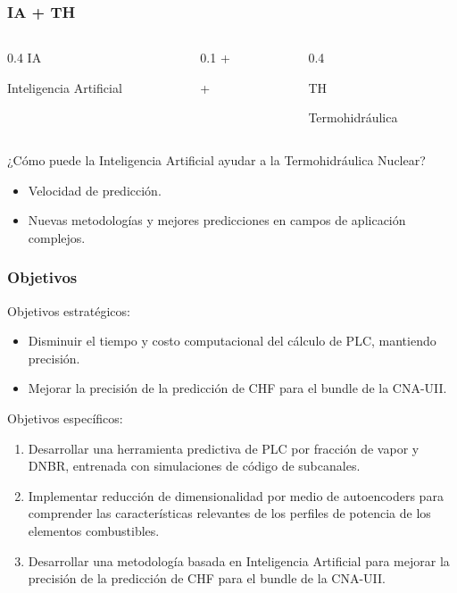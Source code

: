 \documentclass{beamer}
\begin{document}
\begin{frame}
    \frametitle{IA + TH}
    \vspace{2cm}
    \begin{columns}
        \begin{column}{0.4\textwidth}
            \raggedleft
            {\Huge IA}
            \vspace{0.5cm}

            Inteligencia Artificial
        \end{column}
        \begin{column}{0.1\textwidth}
            \centering
            {\Huge +}
            \vspace{0.5cm}

            +
        \end{column}
        \begin{column}{0.4\textwidth}
            \raggedright
            {\Huge TH}
            \vspace{0.5cm}

           Termohidráulica 
        \end{column}

    \end{columns}
    \vspace{1cm}
    ¿Cómo puede la Inteligencia Artificial ayudar a la Termohidráulica Nuclear?
    \begin{itemize}
        \item Velocidad de predicción.
        \item Nuevas metodologías y mejores predicciones en campos de aplicación complejos. 
    \end{itemize}
\end{frame}

\begin{frame}
    \frametitle{Objetivos}
    Objetivos estratégicos:
    \begin{itemize}
        \item Disminuir el tiempo y costo computacional del cálculo de PLC, mantiendo precisión.
        \item Mejorar la precisión de la predicción de CHF para el bundle de la CNA-UII.
    \end{itemize}
    \vfill
    Objetivos específicos:
    \begin{enumerate}
        \item Desarrollar una herramienta predictiva de PLC por fracción de vapor y DNBR, entrenada con simulaciones de código de subcanales.
        \item Implementar reducción de dimensionalidad por medio de autoencoders para comprender las características relevantes de los perfiles de potencia de los elementos combustibles.
        \item Desarrollar una metodología basada en Inteligencia Artificial para mejorar la precisión de la predicción de CHF para el bundle de la CNA-UII.
    \end{enumerate}
\end{frame}
\end{document}
